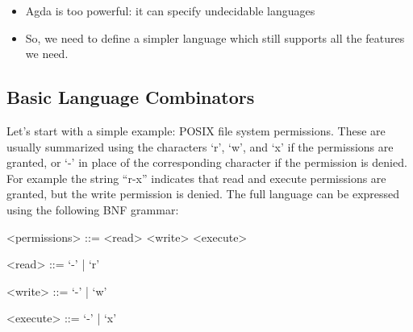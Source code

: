 \begin{itemize}
\item Agda is too powerful: it can specify undecidable languages 
\item So, we need to define a simpler language which still supports all the features we need.
\end{itemize}

\subsection{Basic Language Combinators}

Let's start with a simple example: POSIX file system permissions. These are usually summarized using the characters `r', `w', and `x' if the permissions are granted, or `-' in place of the corresponding character if the permission is denied. For example the string ``r-x'' indicates that read and execute permissions are granted, but the write permission is denied. The full language can be expressed using the following BNF grammar:

\begin{grammar}
<permissions>  ::= <read> <write> <execute>

<read>         ::= `-' | `r'

<write>        ::= `-' | `w'

<execute>      ::= `-' | `x'
\end{grammar}

\begin{code}[hide]%
%
\>[4]\AgdaSpace{}%
\AgdaSpace{}%
\AgdaSpace{}%
\AgdaSpace{}%
\AgdaSymbol{:}\AgdaSpace{}%
\<%
\end{code}

